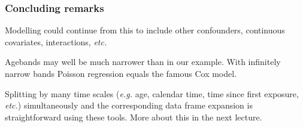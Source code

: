 \documentclass[handout,12pt]{beamer}
\begin{document}
\begin{frame}
\frametitle{Concluding remarks}
 
\bi
\item Modelling could continue from this to include other confounders,
  continuous covariates, interactions, {\it etc.} 
 \medskip
\item
Agebands may well be much narrower than in our example. With infinitely
narrow bands Poisson regression equals the famous Cox model.
\medskip
\item
Splitting by many time scales ({\it e.g.} age, calendar time, time since first exposure, {\it etc.}) simultaneously and the corresponding data frame expansion is straightforward using these tools. More about this 
in the next lecture. 
\ei

\end{frame}
\end{document}

